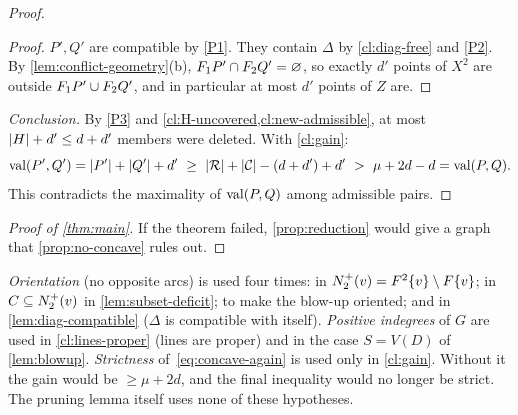 \begin{proof}
\begin{proof}
$P',Q'$ are compatible by \ref{P1}. They contain $\Delta$ by
\cref{cl:diag-free} and \ref{P2}. By \cref{lem:conflict-geometry}(b),
$F_1 P'\cap F_2 Q'=\varnothing$, so exactly $d'$ points of $X^2$ are outside
$F_1 P'\cup F_2 Q'$, and in particular at most $d'$ points of $Z$ are.
\end{proof}

\emph{Conclusion.} By \ref{P3} and \cref{cl:H-uncovered,cl:new-admissible},
at most $\lvert H\rvert+d'\le d+d'$ members were deleted. With \cref{cl:gain}:
\[
 \val(P',Q')=\abs{P'}+\abs{Q'}+d'\ \ge\ \abs\Rf+\abs\Cf-(d+d')+d'\ >\ \mu+2d-d=\val(P,Q).
\]
This contradicts the maximality of $\operatorname{val}(P,Q)$ among admissible pairs.
\end{proof}

\begin{proof}[Proof of \cref{thm:main}]
If the theorem failed, \cref{prop:reduction} would give a graph that
\cref{prop:no-concave} rules out.
\end{proof}

\begin{remark}\label{rem:hypotheses}
\emph{Orientation} (no opposite arcs) is used four times: in
$N^+_2(v)=F^2\{v\}\setminus F\{v\}$; in $C\subseteq N^+_2(v)$ in
\cref{lem:subset-deficit}; to make the blow-up oriented; and in
\cref{lem:diag-compatible} ($\Delta$ is compatible with itself).
\emph{Positive indegrees} of $G$ are used in \cref{cl:lines-proper} (lines
are proper) and in the case $S=V(D)$ of \cref{lem:blowup}.
\emph{Strictness} of~\eqref{eq:concave-again} is used only in
\cref{cl:gain}. Without it the gain would be $\ge\mu+2d$, and the final
inequality would no longer be strict. The pruning lemma itself uses none
of these hypotheses.
\end{remark}

